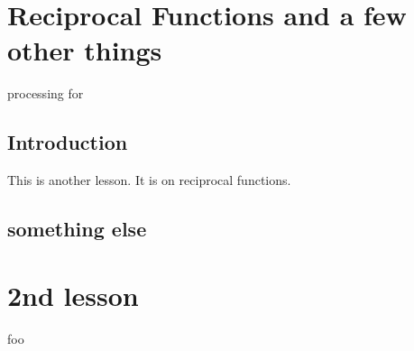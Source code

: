\documentclass[12pt,letterpaper]{memoir}
\newcommand{\myUnitTitle}{}
\let\oldpart\part
\renewcommand{\part}[1]{
    \renewcommand{\myUnitTitle}{#1}
    \oldpart{#1}
}
\renewcommand{\myUnitTitle}{#2}
\begin{document}
\checkandfixthelayout

\pagestyle{myPagestyle}

\frontmatter

\mainmatter




\chapter{Reciprocal Functions and a few other things}

processing for 

\section{Introduction}
This is another lesson. It is on reciprocal functions.

\section{something else}
\Blindtext

\chapter{2nd lesson}
foo
\end{document}

